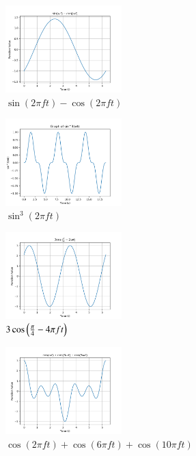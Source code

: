 \documentclass[journal,12pt,twocolumn]{IEEEtran}
\theoremstyle{remark}
\begin{document}
 
 \begin{figure}[h!]
    \centering
    \includegraphics[width=0.4\textwidth]{figs/a1_fig1.png}
    \caption{$\sin(2\pi f t)- \cos(2\pi ft)$}
\end{figure}
 \begin{figure}[h!]
    \centering
    \includegraphics[width=0.4\textwidth]{figs/a1_fig2.png}
    \caption{$\sin^3(2\pi f t)$}
\end{figure}
\newpage
\begin{figure}[h!]
    \centering
    \includegraphics[width=0.4\textwidth]{figs/a1_fig3.png}
    \caption{$3\cos\left(\frac{\pi}{4}- 4\pi f t\right)$}
\end{figure}
\begin{figure}[h!]
    \centering
    \includegraphics[width=0.4\textwidth]{figs/a1_fig4.png}
    \caption{$\cos(2\pi f t)+\cos(6\pi  f t)+\cos(10\pi  f t)$}
\end{figure}
\end{document}
